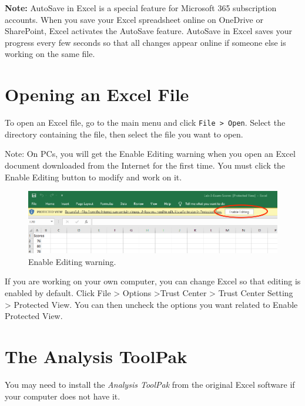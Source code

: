 \documentclass[
]{book}
\begin{document}
\textbf{Note:} AutoSave in Excel is a special feature for Microsoft 365 subscription accounts. When you save your Excel spreadsheet online on OneDrive or SharePoint, Excel activates the AutoSave feature. AutoSave in Excel saves your progress every few seconds so that all changes appear online if someone else is working on the same file.

\hypertarget{opening-an-excel-file}{%
\section{Opening an Excel File}\label{opening-an-excel-file}}

To open an Excel file, go to the main menu and click \texttt{File\ \textgreater{}\ Open}. Select the directory containing the file, then select the file you want to open.

Note: On PCs, you will get the Enable Editing warning when you open an Excel document downloaded from the Internet for the first time. You must click the Enable Editing button to modify and work on it.

\begin{figure}

{\centering \includegraphics[width=0.9\linewidth]{images/enable-editing} 

}

\caption{Enable Editing warning.}\label{fig:enable-editing}
\end{figure}

If you are working on your own computer, you can change Excel so that editing is enabled by default. Click File \textgreater{} Options \textgreater Trust Center \textgreater{} Trust Center Setting \textgreater{} Protected View. You can then uncheck the options you want related to Enable Protected View.

\hypertarget{toolpak}{%
\section{The Analysis ToolPak}\label{toolpak}}

You may need to install the \emph{Analysis ToolPak} from the original Excel software if your computer does not have it.
\end{document}
